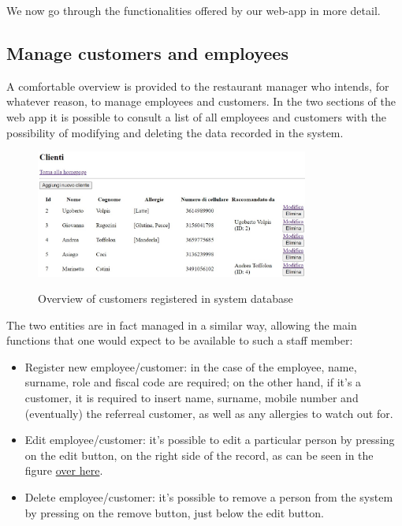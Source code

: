 \documentclass{article}
\begin{document}
    We now go through the functionalities offered by our web-app in more detail.

    \subsection*{Manage customers and employees}
    A comfortable overview is provided to the restaurant manager who intends, for whatever reason, to manage employees and customers. In the two sections of the web app it is possible to consult a list of all employees and customers with the possibility of modifying and deleting the data recorded in the system.

    \begin{figure}[H]
        \centering
        \includegraphics[width=0.8\textwidth]{images/customers_overview.jpg}
        \label{fig:customers_overview}
        \caption{Overview of customers registered in system database}
    \end{figure}

    The two entities are in fact managed in a similar way, allowing the main functions that one would expect to be available to such a staff member:

    \begin{itemize}
        \item Register new employee/customer: in the case of the employee, name, surname, role and fiscal code are required; on the other hand, if it's a customer, it is required to insert name, surname, mobile number and (eventually) the referreal customer, as well as any allergies to watch out for.
        \item Edit employee/customer: it's possible
        to edit a particular person by pressing on the edit button, on the right side of the record, as can be seen in the figure \hyperref[fig:customers_overview]{over here}.
        \item Delete employee/customer: it's possible
        to remove a person from the system by pressing on the remove button, just below the edit button.
    \end{itemize}
\end{document}
